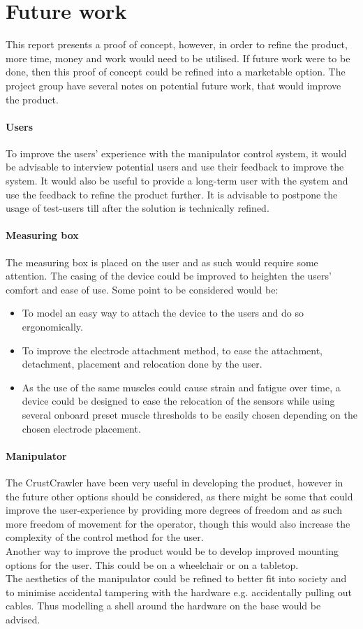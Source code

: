 \section{Future work}
This report presents a proof of concept, however, in order to refine the product, more time, money and work would need to be utilised. 
If future work were to be done, then this proof of concept could be refined into a marketable option.
The project group have several notes on potential future work, that would improve the product.

\paragraph{Users} 
To improve the users' experience with the manipulator control system, it would be advisable to interview potential users and use their feedback to improve the system. It would also be useful to provide a long-term user with the system and use the feedback to refine the product further. It is advisable to postpone the usage of test-users till after the solution is technically refined.

\paragraph{Measuring box} 
The measuring box is placed on the user and as such would require some attention. 
The casing of the device could be improved to heighten the users' comfort and ease of use. 
Some point to be considered would be:
\begin{itemize}
    \item To model an easy way to attach the device to the users and do so ergonomically. 
    \item To improve the electrode attachment method, to ease the attachment, detachment, placement and relocation done by the user.
    \item As the use of the same muscles could cause strain and fatigue over time, a device could be designed to ease the relocation of the sensors while using several onboard preset muscle thresholds to be easily chosen depending on the chosen electrode placement. 
\end{itemize}

\paragraph{Manipulator}
The CrustCrawler have been very useful in developing the product, however in the future other options should be considered, as there might be some that could improve the user-experience by providing more degrees of freedom and as such more freedom of movement for the operator, though this would also increase the complexity of the control method for the user.\\
Another way to improve the product would be to develop improved mounting options for the user. This could be on a wheelchair or on a tabletop.\\
The aesthetics of the manipulator could be refined to better fit into society and to minimise accidental tampering with the hardware e.g. accidentally pulling out cables. Thus modelling a shell around the hardware on the base would be advised.\\
